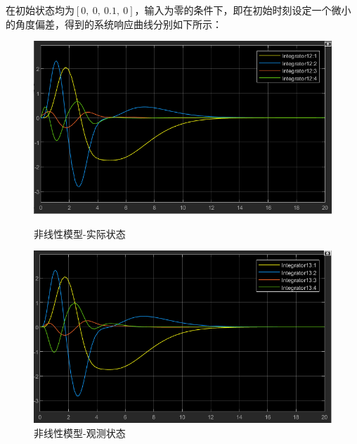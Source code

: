 \documentclass[UTF8]{article}
\begin{document}
在初始状态均为$[0,\ 0,\ 0.1,\ 0]$，输入为零的条件下，即在初始时刻设定一个微小的角度偏差，得到的系统响应曲线分别如下所示：
\begin{figure}[H]
	\centering
	\begin{minipage}{0.49\linewidth}
		\centering
		\includegraphics[width=0.9\linewidth]{figure/倒立摆-非线性模型-状态观测器-实际状态.png}
		\caption{非线性模型-实际状态}
	\end{minipage}
	\begin{minipage}{0.49\linewidth}
		\centering
		\includegraphics[width=0.9\linewidth]{figure/倒立摆-非线性模型-状态观测器-观测状态.png}
		\caption{非线性模型-观测状态}
	\end{minipage}
\end{figure}
\end{document}
